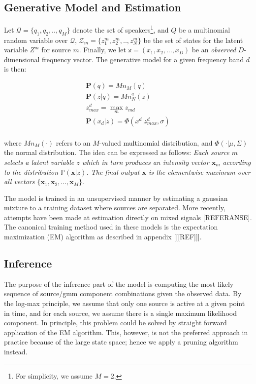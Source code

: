 \documentclass[11pt, oneside, a4paper]{report}
\begin{document}
\subsection{Generative Model and Estimation}

Let $\mathcal{Q} = \{q_1, q_2, .. , q_M\}$ denote the set of speakers\footnote{For simplicity, we assume $M=2$.}, and $Q$ be a multinomial random variable over $\mathcal{Q}$, $\mathcal{Z}_m  = \{z_1^m, z_2^m, .. , z_N^m\}$ be the set of states for the latent variable $Z^m$ for source $m$. Finally, we let $\mathbb{x} = (x_1,x_2,...,x_D)$ be an \emph{observed} $D$-dimensional frequency vector. The generative model for a given frequency band $d$ is then:

\begin{equation}
  \label{maxvq_eqn}
  \begin{array}{lcl}
    \mathbf{P}(q)   = Mn_M(q) \\
    \mathbf{P}(z|q) = Mn_N^q(z) \\ 
    z^d_{max} = \max_mz_{md} \\
    \mathbf{P}(x_d|z) = \Phi(x^d|z^d_{max},\sigma) \\
  \end{array}
\end{equation}

where $Mn_M(\cdot)$ refers to an $M$-valued multinomial distribution,
and $\Phi(\cdot|\mu,\Sigma)$ the normal distribution. The idea can be
expressed as follows: \emph{Each source $m$ selects a latent variable
  $z$ which in turn produces an intensity vector $\mathbf{x}_m$
  according to the distribution $\mathbb{P}(\mathbf{x}|z)$. The final
  output $\mathbf{x}$ is the elementwise maximum over all vectors
  $\{\mathbf{x}_1, \mathbf{x}_2, ..., \mathbf{x}_M\}$}.


The model is trained in an unsupervised manner by estimating a
gaussian mixture to a training dataset where sources are
separated. More recently, attempts have been made at estimation
directly on mixed signals [REFERANSE]. The canonical training method
used in these models is the expectation maximization (EM) algorithm as
described in appendix [[[REF]]]. 


\subsection{Inference}

The purpose of the inference part of the model is computing the most
likely sequence of source/gmm component combinations given the
observed data. By the log-max principle, we assume that only one
source is active at a given point in time, and for each source, we
assume there is a single maximum likelihood component. In principle, this problem could be solved by straight
forward application of the EM algorithm. This, however, is not the
preferred approach in practice because of the large state space; hence
we apply a pruning algorithm instead.
\end{document}
